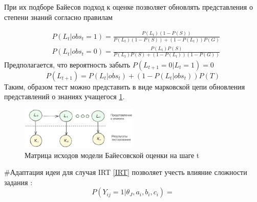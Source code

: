 При их подборе Байесов подход к оценке позволяет обновлять представления о
степени знаний согласно правилам

\begin{equation}
    \begin{aligned}
        &P(L_t| obs_t=1) = \frac{P(L_t)(1-P(S))}{P(L_t)(1-P(S)) + (1-P(L_t))P(G)} \\
        &P(L_t| obs_t=0) = \frac{P(L_t)P(S)}{P(L_t) P(S) + (1-P(L_t))(1-P(G))}
    \end{aligned}
\end{equation}
Предполагается, что вероятность забыть $ P(L_{t+1}=0|L_t=1)=0$
\begin{equation}
    P(L_{t+1}) = P(L_t|obs_t) + \left(1 - P(L_t | obs_t)\right) P(T)
\end{equation}
Таким, образом тест можно представить в виде марковской цепи обновления представлений о знаниях учащегося \ref{bkt_automata}.
\begin{figure}[h]
    \centering
    \includegraphics[width=0.5\textwidth]{assets/pedagogic/social/bkt_automata.excalidraw.png}
    \caption{Матрица исходов модели Байесовской оценки на шаге t}
    \label{bkt_automata}
\end{figure}
#Адаптация идеи для случая IRT \ref{IRT} позволяет учесть влияние сложности задания \cite{bulut2023introduction}:
\begin{equation}
    P(Y_{ij}=1| \theta_J, a_i,b_i,c_i) =
\end{equation}


